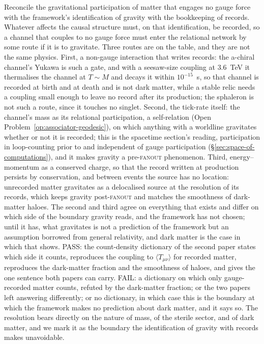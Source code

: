\begin{openproblem}\label{op:sterile-gravity}
Reconcile the gravitational participation of matter that engages no gauge force with the framework's
identification of gravity with the bookkeeping of records. Whatever affects the causal structure
must, on that identification, be recorded, so a channel that couples to no gauge force must enter the
relational network by some route if it is to gravitate. Three routes are on the table, and they are
not the same physics. First, a non-gauge interaction that writes records: the a-chiral channel's
Yukawa is such a gate, and with a seesaw-size coupling at $3.6$~TeV it thermalises the channel at
$T \sim M$ and decays it within $10^{-15}$~s, so that channel is recorded at birth and at death and
is not dark matter, while a stable relic needs a coupling small enough to leave no record after its
production; the sphaleron is not such a route, since it touches no singlet. Second, the tick-rate
itself: the channel's mass as its relational participation, a self-relation
(Open Problem~\ref{op:associator-geodesic}), on which anything with a worldline gravitates whether
or not it is recorded; this is the spacetime section's reading, participation in loop-counting
prior to and independent of gauge participation (\S\ref{sec:space-of-computations}), and it makes
gravity a pre-\textsc{fanout} phenomenon. Third, energy--momentum as a conserved charge, so that the
record written at production persists by conservation, and between events the source has no
location: unrecorded matter gravitates as a delocalised source at the resolution of its records,
which keeps gravity post-\textsc{fanout} and matches the smoothness of dark-matter haloes. The
second and third agree on everything that exists and differ on which side of the boundary gravity
reads, and the framework has not chosen; until it has, what gravitates is not a prediction of the
framework but an assumption borrowed from general relativity, and dark matter is the case in which
that shows. PASS: the count-density dictionary of the second paper states which side it counts,
reproduces the coupling to $\langle T_{\mu\nu}\rangle$ for recorded matter, reproduces the
dark-matter fraction and the smoothness of haloes, and gives the one sentence both papers can
carry. FAIL: a dictionary on which only gauge-recorded matter counts, refuted by the dark-matter
fraction; or the two papers left answering differently; or no dictionary, in which case this is the
boundary at which the framework makes no prediction about dark matter, and it says so. The
resolution bears directly on the nature of mass, of the sterile sector, and of dark matter, and we
mark it as the boundary the identification of gravity with records makes unavoidable.
\end{openproblem}

